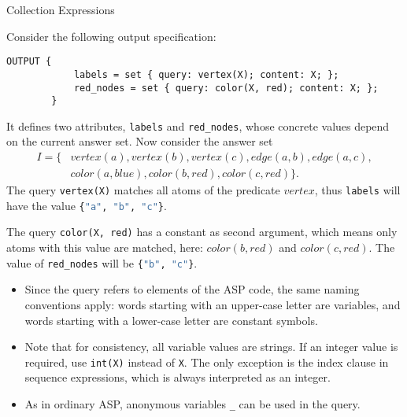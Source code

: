 \documentclass[%
beamer,%
english,%
10pt,%
]{beamer}
\newcommand{\blue}[1]{{\color{blue}#1}}
\begin{document}
\begin{frame}{Collection Expressions}
    \begin{example}
        Consider the following output specification:
        \begin{lstlisting}[basicstyle=\footnotesize,autogobble]
        OUTPUT {
            labels = set { query: vertex(X); content: X; };
            red_nodes = set { query: color(X, red); content: X; };
        }
        \end{lstlisting}
        It defines two attributes, \blue{\lstinline{labels}} and \blue{\lstinline{red_nodes}},
        whose concrete values depend on the current answer set.
        Now consider the answer set
        \begin{align*}
            I = \{ & \mathit{vertex}(a), \mathit{vertex}(b), \mathit{vertex}(c), \mathit{edge}(a,b), \mathit{edge}(a,c), \\
                    & \mathit{color}(a, \mathit{blue}), \mathit{color}(b, \mathit{red}), \mathit{color}(c, \mathit{red}) \}.
        \end{align*}
                The query \blue{\lstinline{vertex(X)}} matches all atoms of the predicate $\mathit{vertex}$,
                thus \blue{\lstinline{labels}} will have the value \lstinline[language=python]|{"a", "b", "c"}|.

                The query \blue{\lstinline{color(X, red)}} has a constant as second argument,
                which means only atoms with this value are matched, here: $\mathit{color}(b, \mathit{red})$ and $\mathit{color}(c, \mathit{red})$.
                The value of \blue{\lstinline{red_nodes}} will be \lstinline[language=python]|{"b", "c"}|.
    \end{example}

    \framebreak
    \begin{itemize}
        \item Since the query refers to elements of the ASP code, the same naming conventions apply:
            words starting with an upper-case letter are variables,
            and words starting with a lower-case letter are constant symbols.
        \item Note that for consistency, all variable values are strings.
            If an integer value is required, use \blue{\lstinline{int(X)}} instead of \blue{\lstinline{X}}.
            The only exception is the \blue{index} clause in sequence expressions, which is always interpreted as an integer.
        \item
            As in ordinary ASP, anonymous variables \blue{\lstinline{_}} can be used in the query.
    \end{itemize}


\end{frame}
\end{document}
